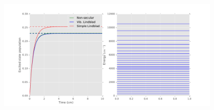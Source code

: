 \documentclass[]{article}
\title{}
\author{}
\begin{document}
\begin{figure}[h]
\includegraphics[width=\textwidth]{Images/Dynamics/Pop_a300_N15_Tem6000_w0300_eps4500.pdf}
\end{figure}
\end{document}
